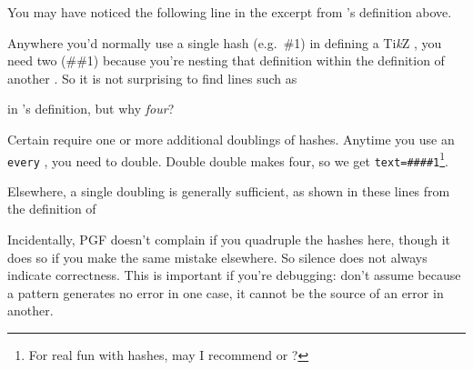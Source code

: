 \documentclass[10pt,british,a4paper]{ltxdoc}
\newcommand*\pkg[1]{\textpkg{#1}}
\newcommand*\TikZ{Ti\emph{k}Z}
\newcommand*\pgf{PGF}
\begin{document}
You may have noticed the following line in the excerpt from 's definition above.
Anywhere you'd normally use a single hash (e.g.~\#1) in defining a \TikZ{} \stylelabelname{}, you need two (\#\#1) because you're nesting that definition within the definition of another \stylelabelname{}.
So it is not surprising to find lines such as
in 's definition, but why \emph{four}?

Certain \keyslabelname{} require one or more additional doublings of hashes.
Anytime you use an \texttt{every} \keylabelname{}, you need to double.
Double double makes four, so we get \texttt{text=\#\#\#\#1}\footnote{%
  For real fun with hashes, may I recommend \pkg{chronos} or \pkg{forest}?}.


Elsewhere, a single doubling is generally sufficient, as shown in these lines from the definition of 
Incidentally, \pgf{} doesn't complain if you quadruple the hashes here, though it does so if you make the same mistake elsewhere.
So silence does not always indicate correctness.
This is important if you're debugging: don't assume because a pattern generates no error in one case, it cannot be the source of an error in another.
\end{document}
